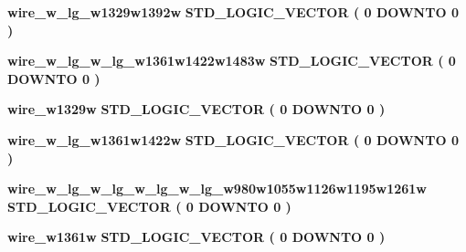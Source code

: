 \begin{DoxyCompactItemize}
\item 
{\bf wire\+\_\+w\+\_\+lg\+\_\+w1329w1392w} {\bfseries \textcolor{comment}{S\+T\+D\+\_\+\+L\+O\+G\+I\+C\+\_\+\+V\+E\+C\+T\+OR}\textcolor{vhdlchar}{ }\textcolor{vhdlchar}{(}\textcolor{vhdlchar}{ }\textcolor{vhdlchar}{ } \textcolor{vhdldigit}{0} \textcolor{vhdlchar}{ }\textcolor{keywordflow}{D\+O\+W\+N\+TO}\textcolor{vhdlchar}{ }\textcolor{vhdlchar}{ } \textcolor{vhdldigit}{0} \textcolor{vhdlchar}{ }\textcolor{vhdlchar}{)}\textcolor{vhdlchar}{ }} 
\item 
{\bf wire\+\_\+w\+\_\+lg\+\_\+w\+\_\+lg\+\_\+w1361w1422w1483w} {\bfseries \textcolor{comment}{S\+T\+D\+\_\+\+L\+O\+G\+I\+C\+\_\+\+V\+E\+C\+T\+OR}\textcolor{vhdlchar}{ }\textcolor{vhdlchar}{(}\textcolor{vhdlchar}{ }\textcolor{vhdlchar}{ } \textcolor{vhdldigit}{0} \textcolor{vhdlchar}{ }\textcolor{keywordflow}{D\+O\+W\+N\+TO}\textcolor{vhdlchar}{ }\textcolor{vhdlchar}{ } \textcolor{vhdldigit}{0} \textcolor{vhdlchar}{ }\textcolor{vhdlchar}{)}\textcolor{vhdlchar}{ }} 
\item 
{\bf wire\+\_\+w1329w} {\bfseries \textcolor{comment}{S\+T\+D\+\_\+\+L\+O\+G\+I\+C\+\_\+\+V\+E\+C\+T\+OR}\textcolor{vhdlchar}{ }\textcolor{vhdlchar}{(}\textcolor{vhdlchar}{ }\textcolor{vhdlchar}{ } \textcolor{vhdldigit}{0} \textcolor{vhdlchar}{ }\textcolor{keywordflow}{D\+O\+W\+N\+TO}\textcolor{vhdlchar}{ }\textcolor{vhdlchar}{ } \textcolor{vhdldigit}{0} \textcolor{vhdlchar}{ }\textcolor{vhdlchar}{)}\textcolor{vhdlchar}{ }} 
\item 
{\bf wire\+\_\+w\+\_\+lg\+\_\+w1361w1422w} {\bfseries \textcolor{comment}{S\+T\+D\+\_\+\+L\+O\+G\+I\+C\+\_\+\+V\+E\+C\+T\+OR}\textcolor{vhdlchar}{ }\textcolor{vhdlchar}{(}\textcolor{vhdlchar}{ }\textcolor{vhdlchar}{ } \textcolor{vhdldigit}{0} \textcolor{vhdlchar}{ }\textcolor{keywordflow}{D\+O\+W\+N\+TO}\textcolor{vhdlchar}{ }\textcolor{vhdlchar}{ } \textcolor{vhdldigit}{0} \textcolor{vhdlchar}{ }\textcolor{vhdlchar}{)}\textcolor{vhdlchar}{ }} 
\item 
{\bf wire\+\_\+w\+\_\+lg\+\_\+w\+\_\+lg\+\_\+w\+\_\+lg\+\_\+w\+\_\+lg\+\_\+w980w1055w1126w1195w1261w} {\bfseries \textcolor{comment}{S\+T\+D\+\_\+\+L\+O\+G\+I\+C\+\_\+\+V\+E\+C\+T\+OR}\textcolor{vhdlchar}{ }\textcolor{vhdlchar}{(}\textcolor{vhdlchar}{ }\textcolor{vhdlchar}{ } \textcolor{vhdldigit}{0} \textcolor{vhdlchar}{ }\textcolor{keywordflow}{D\+O\+W\+N\+TO}\textcolor{vhdlchar}{ }\textcolor{vhdlchar}{ } \textcolor{vhdldigit}{0} \textcolor{vhdlchar}{ }\textcolor{vhdlchar}{)}\textcolor{vhdlchar}{ }} 
\item 
{\bf wire\+\_\+w1361w} {\bfseries \textcolor{comment}{S\+T\+D\+\_\+\+L\+O\+G\+I\+C\+\_\+\+V\+E\+C\+T\+OR}\textcolor{vhdlchar}{ }\textcolor{vhdlchar}{(}\textcolor{vhdlchar}{ }\textcolor{vhdlchar}{ } \textcolor{vhdldigit}{0} \textcolor{vhdlchar}{ }\textcolor{keywordflow}{D\+O\+W\+N\+TO}\textcolor{vhdlchar}{ }\textcolor{vhdlchar}{ } \textcolor{vhdldigit}{0} \textcolor{vhdlchar}{ }\textcolor{vhdlchar}{)}\textcolor{vhdlchar}{ }} 

\end{DoxyCompactItemize}
